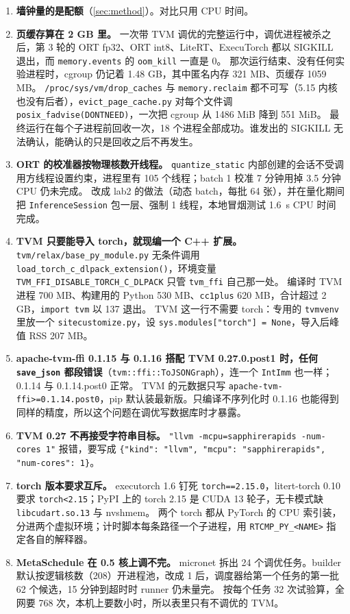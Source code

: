 \documentclass[11pt,a4paper]{ctexart}
\begin{document}
\begin{enumerate}\sloppy
  \item \textbf{墙钟量的是配额}（\cref{sec:method}）。对比只用 CPU 时间。
  \item \textbf{页缓存算在 2 GB 里。} 一次带 TVM 调优的完整运行中，调优进程被杀之后，第 3 轮的 ORT fp32、ORT int8、LiteRT、ExecuTorch 都以 SIGKILL 退出，而 \texttt{memory.events} 的 \texttt{oom\_kill} 一直是 0。
        那次运行结束、没有任何实验进程时，cgroup 仍记着 1.48 GB，其中匿名内存 321 MB、页缓存 1059 MB。
        \texttt{/proc/sys/vm/drop\_caches} 与 \texttt{memory.reclaim} 都不可写（5.15 内核也没有后者），\texttt{evict\_page\_cache.py} 对每个文件调 \texttt{posix\_fadvise(DONTNEED)}，一次把 cgroup 从 1486 MiB 降到 551 MiB。
        最终运行在每个子进程前回收一次，18 个进程全部成功。谁发出的 SIGKILL 无法确认，能确认的只是回收之后不再发生。
  \item \textbf{ORT 的校准器按物理核数开线程。} \texttt{quantize\_static} 内部创建的会话不受调用方线程设置约束，进程里有 105 个线程；batch 1 校准 7 分钟用掉 3.5 分钟 CPU 仍未完成。
        改成 lab2 的做法（动态 batch，每批 64 张），并在量化期间把 \texttt{InferenceSession} 包一层、强制 1 线程，本地冒烟测试 1.6~s CPU 时间完成。
  \item \textbf{TVM 只要能导入 torch，就现编一个 C++ 扩展。} \texttt{tvm/relax/base\_py\_module.py} 无条件调用 \texttt{load\_torch\_c\_dlpack\_extension()}，环境变量 \texttt{TVM\_FFI\_DISABLE\_TORCH\_C\_DLPACK} 只管 \texttt{tvm\_ffi} 自己那一处。
        编译时 TVM 进程 700 MB、构建用的 Python 530 MB、\texttt{cc1plus} 620 MB，合计超过 2 GB，\texttt{import tvm} 以 137 退出。
        TVM 这一行不需要 torch：专用的 \texttt{tvmvenv} 里放一个 \texttt{sitecustomize.py}，设 \texttt{sys.modules["torch"] = None}，导入后峰值 RSS 207 MB。
  \item \textbf{apache-tvm-ffi 0.1.15 与 0.1.16 搭配 TVM 0.27.0.post1 时，任何 \texttt{save\_json} 都段错误}（\texttt{tvm::ffi::ToJSONGraph}），连一个 \texttt{IntImm} 也一样；0.1.14 与 0.1.14.post0 正常。
        TVM 的元数据只写 \texttt{apache-tvm-ffi>=0.1.14.post0}，pip 默认装最新版。只编译不序列化时 0.1.16 也能得到同样的精度，所以这个问题在调优写数据库时才暴露。
  \item \textbf{TVM 0.27 不再接受字符串目标。} \texttt{"llvm -mcpu=sapphirerapids -num-cores 1"} 报错，要写成 \texttt{\{"kind": "llvm", "mcpu": "sapphirerapids", "num-cores": 1\}}。
  \item \textbf{torch 版本要求互斥。} executorch 1.6 钉死 \texttt{torch==2.15.0}，litert-torch 0.10 要求 \texttt{torch<2.15}；PyPI 上的 torch 2.15 是 CUDA 13 轮子，无卡模式缺 \texttt{libcudart.so.13} 与 nvshmem。
        两个 torch 都从 PyTorch 的 CPU 索引装，分进两个虚拟环境；计时脚本每条路径一个子进程，用 \texttt{RTCMP\_PY\_<NAME>} 指定各自的解释器。
  \item \textbf{MetaSchedule 在 0.5 核上调不完。} micronet 拆出 24 个调优任务。builder 默认按逻辑核数（208）开进程池，改成 1 后，调度器给第一个任务的第一批 62 个候选，15 分钟到超时时 runner 仍未量完。
        按每个任务 32 次试验算，全网要 768 次，本机上要数小时，所以表里只有不调优的 TVM。
\end{enumerate}
\end{document}
